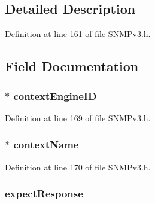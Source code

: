 \subsection{Detailed Description}


Definition at line 161 of file S\+N\+M\+Pv3.\+h.



\subsection{Field Documentation}
\hypertarget{structdispatcher_status_info_aa75baf2d001f5d5ac415eed279fd6e85}{}
\subsubsection[{context\+Engine\+I\+D}]{$\ast$ context\+Engine\+I\+D}\label{structdispatcher_status_info_aa75baf2d001f5d5ac415eed279fd6e85}


Definition at line 169 of file S\+N\+M\+Pv3.\+h.

\hypertarget{structdispatcher_status_info_af55ce5882ccbc8435fb33f1020c74550}{}
\subsubsection[{context\+Name}]{$\ast$ context\+Name}\label{structdispatcher_status_info_af55ce5882ccbc8435fb33f1020c74550}


Definition at line 170 of file S\+N\+M\+Pv3.\+h.

\hypertarget{structdispatcher_status_info_a1f80a620b82899e098699391f19be85e}{}
\subsubsection[{expect\+Response}]{ expect\+Response}\label{structdispatcher_status_info_a1f80a620b82899e098699391f19be85e}


